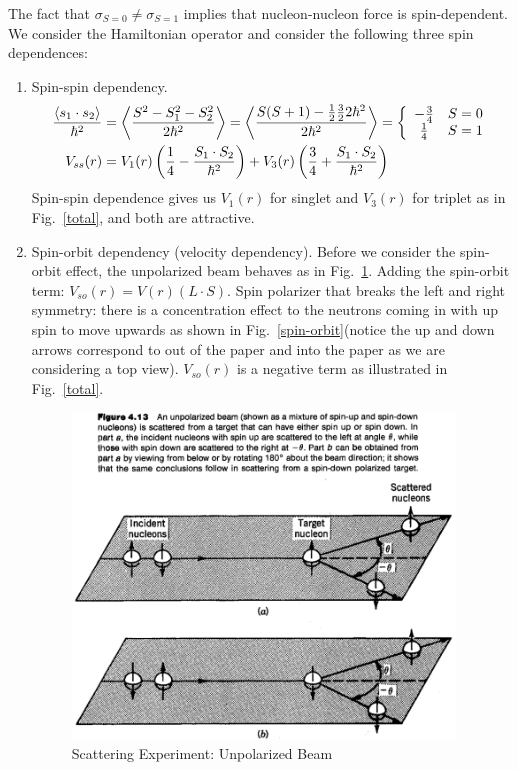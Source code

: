 \documentclass{school-22.101-notes}
\begin{document}
The fact that $\sigma_{S=0} \neq \sigma_{S=1}$ implies that nucleon-nucleon force is spin-dependent. We consider the Hamiltonian operator and consider the following three spin dependences: 
\begin{enumerate}
\item Spin-spin dependency. 
\begin{align}
 \frac{\left< s_1 \cdot s_2 \right>}{\hbar^2} &= \left< \frac{S^2 - S_1^2 - S_2^2}{2 \hbar^2} \right>  =  \left< \frac{S(S+1) - \frac{1}{2} \frac{3}{2} 2 \hbar^2}{2 \hbar^2}  \right> = \left\{  \begin{array}{cc} - \frac{3}{4} & S = 0 \\ \frac{1}{4}  & S= 1 \end{array} \right. \\
V_{ss} (r) &= V_1 (r) \left( \frac{1}{4} - \frac{S_1 \cdot S_2}{\hbar^2} \right) + V_3 (r) \left( \frac{3}{4} + \frac{S_1 \cdot S_2}{\hbar^2} \right)
\end{align}
Spin-spin dependence gives us $V_1(r)$ for singlet and $V_3(r)$ for triplet as in Fig.~\ref{total}, and both are attractive.


\item Spin-orbit dependency (velocity dependency). Before we consider the spin-orbit effect, the unpolarized beam behaves as in Fig.~\ref{un-spin-orbit}. Adding the spin-orbit term: $\displaystyle V_{so}(r) = V (r) (L \cdot S)$. Spin polarizer that breaks the left and right symmetry: there is a concentration effect to the neutrons coming in with up spin to move upwards as shown in Fig.~\ref{spin-orbit}(notice the up and down arrows correspond to out of the paper and into the paper as we are considering a top view). $V_{so}(r)$ is a negative term as illustrated in Fig.~\ref{total}. 

  \begin{figure}[ht]
    \centering
    \includegraphics[width=4in]{images/scattering/un-spin-orbit.png}
    \caption{Scattering Experiment: Unpolarized Beam} \label{un-spin-orbit}
  \end{figure}


\end{enumerate}
\end{document}
